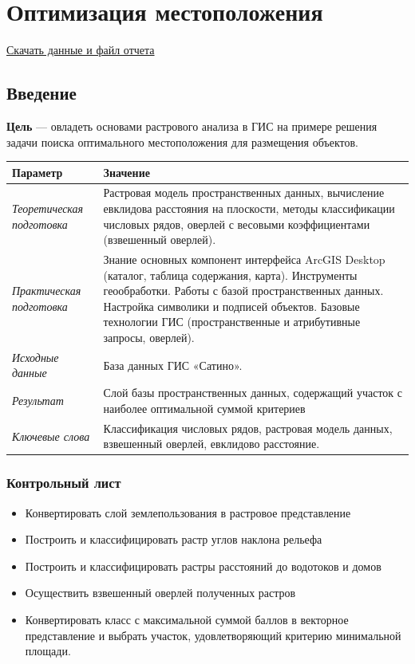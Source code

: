 \documentclass[12pt,]{book}
\providecommand{\tightlist}{%
  \setlength{\itemsep}{0pt}\setlength{\parskip}{0pt}}
\begin{document}
\hypertarget{weighted-overlay}{%
\chapter{Оптимизация местоположения}\label{weighted-overlay}}

\href{http://autolab.geogr.msu.ru/gis/data/Ex14.zip}{Скачать данные и файл отчета}

\hypertarget{weighted-overlay-intro}{%
\section{Введение}\label{weighted-overlay-intro}}

\textbf{Цель} --- овладеть основами растрового анализа в ГИС на примере решения задачи поиска оптимального местоположения для размещения объектов.

\begin{longtable}[]{@{}ll@{}}
\toprule
Параметр & Значение\tabularnewline
\midrule
\endhead
\emph{Теоретическая подготовка} & Растровая модель пространственных данных, вычисление евклидова расстояния на плоскости, методы классификации числовых рядов, оверлей с весовыми коэффициентами (взвешенный оверлей).\tabularnewline
\emph{Практическая подготовка} & Знание основных компонент интерфейса ArcGIS Desktop (каталог, таблица содержания, карта). Инструменты геообработки. Работы с базой пространственных данных. Настройка символики и подписей объектов. Базовые технологии ГИС (пространственные и атрибутивные запросы, оверлей).\tabularnewline
\emph{Исходные данные} & База данных ГИС «Сатино».\tabularnewline
\emph{Результат} & Слой базы пространственных данных, содержащий участок с наиболее оптимальной суммой критериев\tabularnewline
\emph{Ключевые слова} & Классификация числовых рядов, растровая модель данных, взвешенный оверлей, евклидово расстояние.\tabularnewline
\bottomrule
\end{longtable}

\hypertarget{weighted-overlay-control}{%
\subsection{Контрольный лист}\label{weighted-overlay-control}}

\begin{itemize}
\tightlist
\item
  Конвертировать слой землепользования в растровое представление
\item
  Построить и классифицировать растр углов наклона рельефа
\item
  Построить и классифицировать растры расстояний до водотоков и домов
\item
  Осуществить взвешенный оверлей полученных растров
\item
  Конвертировать класс с максимальной суммой баллов в векторное представление и выбрать участок, удовлетворяющий критерию минимальной площади.
\end{itemize}
\end{document}
